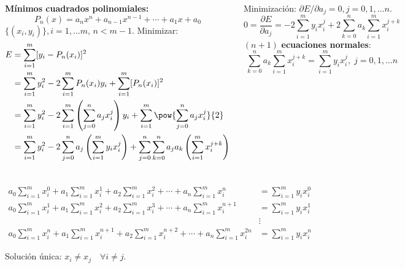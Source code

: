 \documentclass[9pt, aspectratio=169]{beamer}
\begin{document}
\begin{frame}
  \begin{columns}[t]
    \cx
    \textbf{Mínimos cuadrados polinomiales:}
    \[ P_n(x) = a_n x^n + a_{n-1} x^{n-1} + \cdots + a_1 x + a_0 \]
    $\{(x_i, y_i)\}, i = 1, \ldots m$, $n < m-1$. Minimizar:
    \begin{align*}
      E & = \sum_{i=1}^m [y_i - P_n(x_i)]^2                                                                                                                        \\
        & = \sum_{i=1}^m y_i^2 - 2 \sum_{i=1}^m P_n(x_i) y_i + \sum_{i=1}^m [P_n(x_i)]^2                                                                           \\
        & = \sum_{i=1}^m y_i^2 -2 \sum_{i=1}^m \left(\sum_{j=0}^n a_j x_i^j \right) y_i + \sum_{i=1}^m \pow{\sum_{j=0}^n a_j x_i^j}{2}                             \\
        & = \sum_{i=1}^m y_i^2 -2 \sum_{j=0}^n a_j \left( \sum_{i=1}^m y_i x_i^j \right) + \sum_{j=0}^n \sum_{k=0}^n a_j a_k \left( \sum_{i=1}^m x_i^{j+k} \right)
    \end{align*}
    \pause

    Minimización: $\partial E / \partial a_j = 0, j = 0, 1, \ldots n$.
    \[ 0 = \frac{\partial E}{\partial a_j} = -2 \sum_{i=1}^m y_i x_i^j + 2 \sum_{k=0}^na_k \sum_{i=1}^m x_i^{j+k} \]
    $(n+1)$ \textbf{ecuaciones normales}:
    \[ \sum_{k=0}^n a_k \sum_{i=1}^m x_i^{j+k} = \sum_{i=1}^m y_i x_i^j, \; j=0, 1, \ldots n \]
  \end{columns}
\end{frame}

\begin{frame}
  \begin{align*}
    a_0 \sum_{i=1}^m x_i^0 + a_1 \sum_{i=1}^m x_i^1 + a_2 \sum_{i=1}^m x_i^2 + \cdots + a_n \sum_{i=1}^m x_i^n            & = \sum_{i=1}^m y_i x_i^0 \\
    a_0 \sum_{i=1}^m x_i^1 + a_1 \sum_{i=1}^m x_i^2 + a_2 \sum_{i=1}^m x_i^3 + \cdots + a_n \sum_{i=1}^m x_i^{n+1}        & = \sum_{i=1}^m y_i x_i^1 \\
                                                                                                                          & \vdots                   \\
    a_0 \sum_{i=1}^m x_i^n + a_1 \sum_{i=1}^m x_i^{n+1} + a_2 \sum_{i=1}^m x_i^{n+2} + \cdots + a_n \sum_{i=1}^m x_i^{2n} & = \sum_{i=1}^m y_i x_i^n
  \end{align*}

  \centering \alert{Solución única:} $x_i \neq x_j \quad \forall i \neq j$.
\end{frame}
\end{document}
